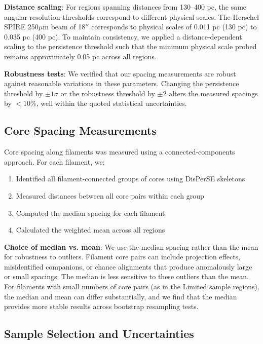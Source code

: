 \documentclass[11pt,a4paper]{article}
\begin{document}
\textbf{Distance scaling}: For regions spanning distances from 130--400 pc, the same angular resolution thresholds correspond to different physical scales. The Herschel SPIRE 250$\mu$m beam of 18$''$ corresponds to physical scales of 0.011 pc (130 pc) to 0.035 pc (400 pc). To maintain consistency, we applied a distance-dependent scaling to the persistence threshold such that the minimum physical scale probed remains approximately 0.05 pc across all regions.

\textbf{Robustness tests}: We verified that our spacing measurements are robust against reasonable variations in these parameters. Changing the persistence threshold by $\pm 1\sigma$ or the robustness threshold by $\pm 2$ alters the measured spacings by $<10$\%, well within the quoted statistical uncertainties.

\subsection{Core Spacing Measurements}

Core spacing along filaments was measured using a connected-components approach. For each filament, we:
\begin{enumerate}
    \item Identified all filament-connected groups of cores using DisPerSE skeletons
    \item Measured distances between all core pairs within each group
    \item Computed the median spacing for each filament
    \item Calculated the weighted mean across all regions
\end{enumerate}

\textbf{Choice of median vs. mean}: We use the median spacing rather than the mean for robustness to outliers. Filament core pairs can include projection effects, misidentified companions, or chance alignments that produce anomalously large or small spacings. The median is less sensitive to these outliers than the mean. For filaments with small numbers of core pairs (as in the Limited sample regions), the median and mean can differ substantially, and we find that the median provides more stable results across bootstrap resampling tests.

\subsection{Sample Selection and Uncertainties}
\end{document}
